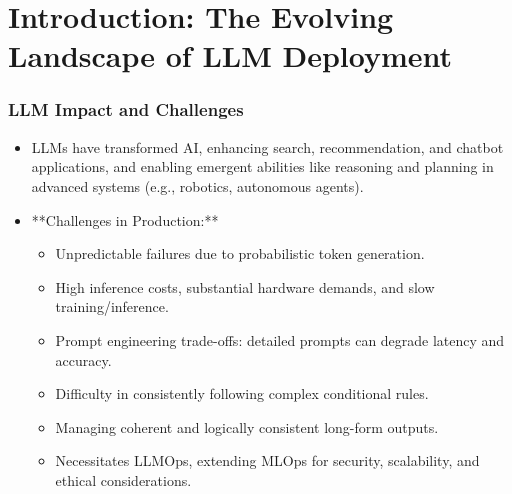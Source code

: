 \documentclass{beamer}       %
\begin{document}
\section{Introduction: The Evolving Landscape of LLM Deployment}

\begin{frame}
    \frametitle{LLM Impact and Challenges}
    \begin{itemize}
        \item LLMs have transformed AI, enhancing search, recommendation, and chatbot applications, and enabling emergent abilities like reasoning and planning in advanced systems (e.g., robotics, autonomous agents).
        \item **Challenges in Production:**
        \begin{itemize}
            \item Unpredictable failures due to probabilistic token generation.
            \item High inference costs, substantial hardware demands, and slow training/inference.
            \item Prompt engineering trade-offs: detailed prompts can degrade latency and accuracy.
            \item Difficulty in consistently following complex conditional rules.
            \item Managing coherent and logically consistent long-form outputs.
            \item Necessitates LLMOps, extending MLOps for security, scalability, and ethical considerations.
        \end{itemize}
    \end{itemize}
\end{frame}
\end{document}
